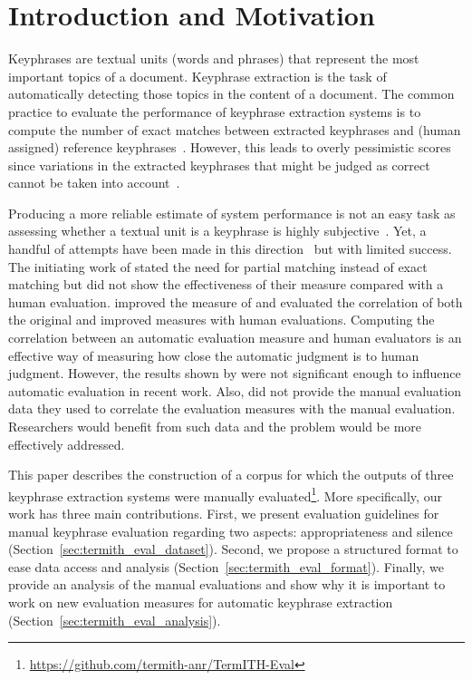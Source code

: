 \section{Introduction and Motivation}
\label{sec:introduction}
    Keyphrases are textual units (words and phrases) that represent the most important topics of a document.
    Keyphrase extraction is the task of automatically detecting those topics in the content of a document.
    The common practice to evaluate the performance of keyphrase extraction systems is to compute the number of exact matches between extracted keyphrases and (human assigned) reference keyphrases~\cite{hasan2014state_of_the_art}.
    However, this leads to overly pessimistic scores since variations in the extracted keyphrases that might be judged as correct cannot be taken into account~\cite{zesch2009rprecision}.
    
    
    Producing a more reliable estimate of system performance is not an easy task as assessing whether a textual unit is a keyphrase is highly subjective~\cite{kim2010rprecision}.
    Yet, a handful of attempts have been made in this direction~\cite{zesch2009rprecision,kim2010rprecision} but with limited success.
    The initiating work of  stated the need for partial matching instead of exact matching but did not show the effectiveness of their measure compared with a human evaluation.
     improved the measure of  and evaluated the correlation of both the original and improved measures with human evaluations.
    Computing the correlation between an automatic evaluation measure and human evaluators is an effective way of measuring how close the automatic judgment is to human judgment.
    However, the results shown by  were not significant enough to influence automatic evaluation in recent work.
    Also,  did not provide the manual evaluation data they used to correlate the evaluation measures with the manual evaluation.
    Researchers would benefit from such data and the problem would be more effectively addressed.

    This paper describes the construction of a corpus for which the outputs of three keyphrase extraction systems were manually evaluated\footnote{\scriptsize\url{https://github.com/termith-anr/TermITH-Eval}}.
    More specifically, our work has three main contributions.
    First, we present evaluation guidelines for manual keyphrase evaluation regarding two aspects: appropriateness and silence (Section~\ref{sec:termith_eval_dataset}).
    Second, we propose a structured format to ease data access and analysis (Section~\ref{sec:termith_eval_format}).
    Finally, we provide an analysis of the manual evaluations and show why it is important to work on new evaluation measures for automatic keyphrase extraction (Section~\ref{sec:termith_eval_analysis}).
